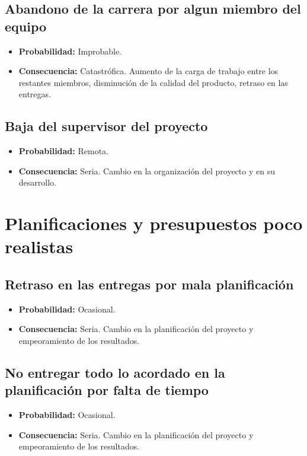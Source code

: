 \documentclass[spanish,a4paper,12pt]{report}	%
\begin{document}
\subsection*{Abandono de la carrera por algun miembro del equipo}
	\begin{itemize}
		\item \textbf {Probabilidad: }Improbable.
		\item \textbf {Consecuencia: }Catastrófica. Aumento de la carga de trabajo entre los restantes miembros, disminución de la calidad del producto, retraso en las entregas.
	\end{itemize}

\subsection*{Baja del supervisor del proyecto}
	\begin{itemize}
		\item \textbf {Probabilidad: }Remota.
		\item \textbf {Consecuencia: }Seria. Cambio en la organización del proyecto y en su desarrollo.
	\end{itemize}

%
\section{Planificaciones y presupuestos poco realistas}

\subsection*{Retraso en las entregas por mala planificación}
	\begin{itemize}
		\item \textbf {Probabilidad: }Ocasional.
		\item \textbf {Consecuencia: }Seria. Cambio en la planificación del proyecto y empeoramiento de los resultados.
	\end{itemize}

\subsection*{No entregar todo lo acordado en la planificación por falta de tiempo}
	\begin{itemize}
		\item \textbf {Probabilidad: }Ocasional.
		\item \textbf {Consecuencia: }Seria. Cambio en la planificación del proyecto y empeoramiento de los resultados.
	\end{itemize}
\end{document}
